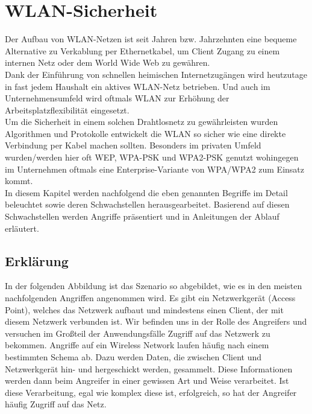 
\chapter{WLAN-Sicherheit}

Der Aufbau von WLAN-Netzen ist seit Jahren bzw. Jahrzehnten eine bequeme Alternative zu Verkablung per Ethernetkabel, um Client Zugang zu einem internen Netz oder dem World Wide Web zu gewähren. \\
Dank der Einführung von schnellen heimischen Internetzugängen wird heutzutage in fast jedem Haushalt ein aktives WLAN-Netz betrieben. Und auch im Unternehmensumfeld wird oftmals WLAN zur Erhöhung der Arbeitsplatzflexibilität eingesetzt. \\
Um die Sicherheit in einem solchen Drahtlosnetz zu gewährleisten wurden Algorithmen und Protokolle entwickelt die WLAN so sicher wie eine direkte Verbindung per Kabel machen sollten. Besonders im privaten Umfeld wurden/werden hier oft WEP, WPA-PSK und WPA2-PSK genutzt wohingegen im Unternehmen oftmals eine Enterprise-Variante von WPA/WPA2 zum Einsatz kommt. \\
In diesem Kapitel werden nachfolgend die eben genannten Begriffe im Detail beleuchtet sowie deren Schwachstellen herausgearbeitet. Basierend auf diesen Schwachstellen werden Angriffe präsentiert und in Anleitungen der Ablauf erläutert. 

\section{Erklärung}

In der folgenden Abbildung ist das Szenario so abgebildet, wie es in den meisten nachfolgenden
Angriffen angenommen wird. Es gibt ein Netzwerkgerät (Access Point), welches das Netzwerk
aufbaut und mindestens einen Client, der mit diesem Netzwerk verbunden ist. Wir befinden
uns in der Rolle des Angreifers und versuchen im Großteil der Anwendungsfälle Zugriff auf
das Netzwerk zu bekommen.
Angriffe auf ein Wireless Network laufen häufig nach einem bestimmten Schema ab. Dazu
werden Daten, die zwischen Client und Netzwerkgerät hin- und hergeschickt werden,
gesammelt. Diese Informationen werden dann beim Angreifer in einer gewissen Art und
Weise verarbeitet. Ist diese Verarbeitung, egal wie komplex diese ist, erfolgreich, so hat der
Angreifer häufig Zugriff auf das Netz.

